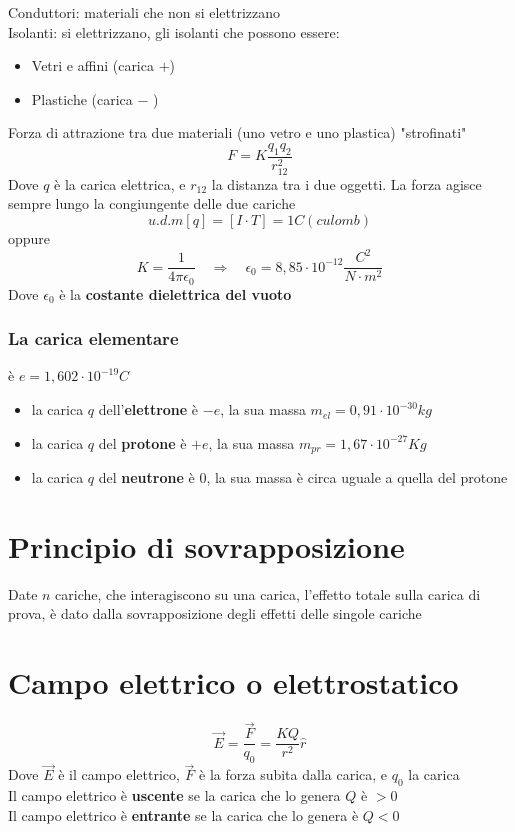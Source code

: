 \documentclass[a4paper]{report}
\begin{document}
  Conduttori: materiali che non si elettrizzano \\
  Isolanti: si elettrizzano, gli isolanti che possono essere:
  \begin{itemize}
    \item Vetri e affini (carica $+$)
    \item Plastiche (carica $-$ )
  \end{itemize}
  Forza di attrazione tra due materiali (uno vetro e uno plastica) "strofinati"
  \[ F = K\frac{q_1 q_2}{r_{12}^2} \]
  Dove $q$ è la carica elettrica, e $r_{12}$ la distanza tra i due oggetti. La forza agisce sempre lungo la congiungente delle due cariche
  \[u.d.m[q] = [I\cdot T] = 1C (culomb)\]
  oppure
  \[ K = \frac{1}{4 \pi \epsilon_0} \quad \Rightarrow \quad \epsilon_0 = 8,85\cdot 10^{-12} \frac{C^2}{N\cdot m^2}\]
  Dove $\epsilon_0$ è la \textbf{costante dielettrica del vuoto}
  \subsubsection{La carica elementare}
  è $e = 1,602 \cdot 10^{-19} C$
  \begin{itemize}
    \item la carica $q$ dell'\textbf{elettrone} è $-e$, la sua massa $m_{el} = 0,91 \cdot 10^{-30} kg$
    \item la carica $q$ del \textbf{protone} è $+e$, la sua massa $m_{pr} = 1,67 \cdot 10^{-27} Kg$
    \item la carica $q$ del \textbf{neutrone} è $0$, la sua massa è circa uguale a quella del protone
  \end{itemize}

  \section{Principio di sovrapposizione}
  Date $n$ cariche, che interagiscono su una carica, l'effetto totale sulla carica di prova, è dato dalla sovrapposizione degli effetti delle singole cariche

  \section{Campo elettrico o elettrostatico}
  \[\vec{E} = \frac{\vec{F}}{q_0} = \frac{K Q}{r^2} \hat{r}\]
  Dove $\vec{E}$ è il campo elettrico, $\vec{F}$ è la forza subita dalla carica, e $q_0$ la carica\\
  Il campo elettrico è \textbf{uscente} se la carica che lo genera $Q$ è $>0$\\
  Il campo elettrico è \textbf{entrante} se la carica che lo genera è $Q<0$
\end{document}
